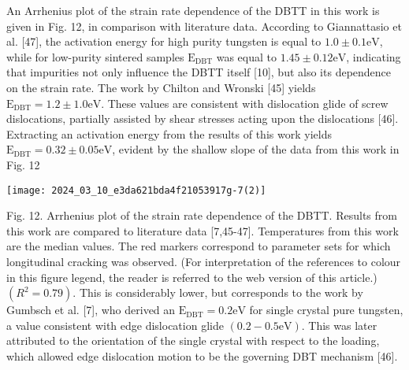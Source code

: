 \documentclass[10pt]{article}
\begin{document}
An Arrhenius plot of the strain rate dependence of the DBTT in this work is given in Fig. 12, in comparison with literature data. According to Giannattasio et al. [47], the activation energy for high purity tungsten is equal to $1.0 \pm 0.1 \mathrm{eV}$, while for low-purity sintered samples $\mathrm{E}_{\mathrm{DBT}}$ was equal to $1.45 \pm 0.12 \mathrm{eV}$, indicating that impurities not only influence the DBTT itself [10], but also its dependence on the strain rate. The work by Chilton and Wronski [45] yields $\mathrm{E}_{\mathrm{DBT}}=1.2 \pm 1.0 \mathrm{eV}$. These values are consistent with dislocation glide of screw dislocations, partially assisted by shear stresses acting upon the dislocations [46]. Extracting an activation energy from the results of this work yields $\mathrm{E}_{\mathrm{DBT}}=0.32 \pm 0.05 \mathrm{eV}$, evident by the shallow slope of the data from this work in Fig. 12

\begin{center}
\texttt{[image: 2024\_03\_10\_e3da621bda4f21053917g-7(2)]}
\end{center}

Fig. 12. Arrhenius plot of the strain rate dependence of the DBTT. Results from this work are compared to literature data [7,45-47]. Temperatures from this work are the median values. The red markers correspond to parameter sets for which longitudinal cracking was observed. (For interpretation of the references to colour in this figure legend, the reader is referred to the web version of this article.) $\left(R^{2}=0.79\right)$. This is considerably lower, but corresponds to the work by Gumbsch et al. [7], who derived an $\mathrm{E}_{\mathrm{DBT}}=0.2 \mathrm{eV}$ for single crystal pure tungsten, a value consistent with edge dislocation glide $(0.2-0.5 \mathrm{eV})$. This was later attributed to the orientation of the single crystal with respect to the loading, which allowed edge dislocation motion to be the governing DBT mechanism [46].
\end{document}
